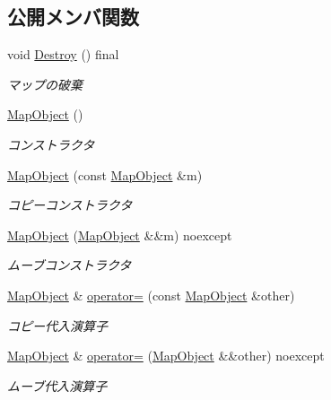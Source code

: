 \subsection*{公開メンバ関数}
\begin{DoxyCompactItemize}
\item 
void \mbox{\hyperlink{class_map_object_ad4bcfdc33bd945a9aa5e50a57c2704bc}{Destroy}} () final
\begin{DoxyCompactList}\small\item\em マップの破棄 \end{DoxyCompactList}\item 
\mbox{\hyperlink{class_map_object_a568754515cc72ce0861d30c3040d26d2}{Map\+Object}} ()
\begin{DoxyCompactList}\small\item\em コンストラクタ \end{DoxyCompactList}\item 
\mbox{\hyperlink{class_map_object_a4d69915b6837056e40c0c17afe78ce8e}{Map\+Object}} (const \mbox{\hyperlink{class_map_object}{Map\+Object}} \&m)
\begin{DoxyCompactList}\small\item\em コピーコンストラクタ \end{DoxyCompactList}\item 
\mbox{\hyperlink{class_map_object_ad3779307ee41c0bc0fdf4b419baac3da}{Map\+Object}} (\mbox{\hyperlink{class_map_object}{Map\+Object}} \&\&m) noexcept
\begin{DoxyCompactList}\small\item\em ムーブコンストラクタ \end{DoxyCompactList}\item 
\mbox{\hyperlink{class_map_object}{Map\+Object}} \& \mbox{\hyperlink{class_map_object_a4ff3c31cc463a650e4d870ea65b65c58}{operator=}} (const \mbox{\hyperlink{class_map_object}{Map\+Object}} \&other)
\begin{DoxyCompactList}\small\item\em コピー代入演算子 \end{DoxyCompactList}\item 
\mbox{\hyperlink{class_map_object}{Map\+Object}} \& \mbox{\hyperlink{class_map_object_ae36fa838f3f8bac8ef2d67b39adf0298}{operator=}} (\mbox{\hyperlink{class_map_object}{Map\+Object}} \&\&other) noexcept
\begin{DoxyCompactList}\small\item\em ムーブ代入演算子 \end{DoxyCompactList}\item 

\end{DoxyCompactItemize}
